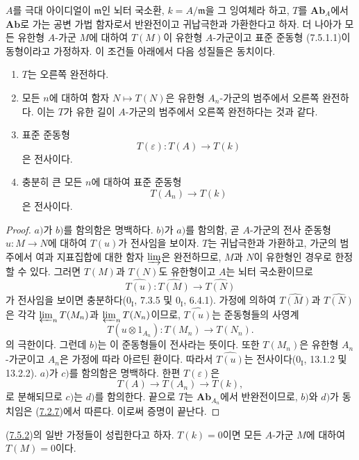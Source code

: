 \begin{proposition}[7.5.2]
\label{III.7.5.2-fr}
$A$를 극대 아이디얼이 $\mathfrak m$인 뇌터 국소환, $k=A/\mathfrak m$을
그 잉여체라 하고, $T$를 $\mathbf{Ab}_A$에서 $\mathbf{Ab}$로 가는
공변 가법 함자로서 반완전이고 귀납극한과 가환한다고 하자. 더 나아가
모든 유한형 $A$-가군 $M$에 대하여 $T(M)$이 유한형 $A$-가군이고
표준 준동형 (7.5.1.1)이 동형이라고 가정하자. 이 조건들 아래에서
다음 성질들은 동치이다.
\begin{enumerate}
  \item[a)] $T$는 오른쪽 완전하다.
  \item[b)] 모든 $n$에 대하여 함자 $N\mapsto T(N)$은 유한형
    $A_n$-가군의 범주에서 오른쪽 완전하다. 이는 $T$가 유한 길이
    $A$-가군의 범주에서 오른쪽 완전하다는 것과 같다.
  \item[c)] 표준 준동형
    \[
      T(\varepsilon):T(A)\longrightarrow T(k)
    \]
    은 전사이다.
  \item[d)] 충분히 큰 모든 $n$에 대하여 표준 준동형
    \[
      T(A_n)\longrightarrow T(k)
    \]
    은 전사이다.
\end{enumerate}
\end{proposition}

\begin{proof}
$a)$가 $b)$를 함의함은 명백하다. $b)$가 $a)$를 함의함, 곧
$A$-가군의 전사 준동형 $u:M\to N$에 대하여 $T(u)$가 전사임을
보이자. $T$는 귀납극한과 가환하고, 가군의 범주에서 여과 지표집합에
대한 함자 $\varinjlim$은 완전하므로, $M$과 $N$이 유한형인 경우로
한정할 수 있다. 그러면 $T(M)$과 $T(N)$도 유한형이고 $A$는 뇌터
국소환이므로
\[
  \widehat{T(u)}:
  \widehat{T(M)}
  \longrightarrow
  \widehat{T(N)}
\]
가 전사임을 보이면 충분하다($0_{\mathrm I}$, 7.3.5 및
$0_{\mathrm I}$, 6.4.1). 가정에 의하여 $\widehat{T(M)}$과
$\widehat{T(N)}$은 각각 $\varprojlim_n T(M_n)$과
$\varprojlim_n T(N_n)$이므로, $\widehat{T(u)}$는 준동형들의 사영계
\[
  T(u\otimes1_{A_n}):T(M_n)\longrightarrow T(N_n).
\]
의 극한이다. 그런데 $b)$는 이 준동형들이 전사라는 뜻이다. 또한
$T(M_n)$은 유한형 $A_n$-가군이고 $A_n$은 가정에 따라 아르틴 환이다.
따라서 $\widehat{T(u)}$는 전사이다($0_{\mathrm I}$, 13.1.2 및
13.2.2). $a)$가 $c)$를 함의함은 명백하다. 한편 $T(\varepsilon)$은
\[
  T(A)\longrightarrow T(A_n)\longrightarrow T(k),
\]
로 분해되므로 $c)$는 $d)$를 함의한다. 끝으로 $T$는
$\mathbf{Ab}_{A_n}$에서 반완전이므로, $b)$와 $d)$가 동치임은
(\hyperref[III.7.2.7-fr]{7.2.7})에서 따른다. 이로써 증명이 끝난다.
\end{proof}

\begin{corollary}[7.5.3]
\label{III.7.5.3-fr}
(\hyperref[III.7.5.2-fr]{7.5.2})의 일반 가정들이 성립한다고 하자.
$T(k)=0$이면 모든 $A$-가군 $M$에 대하여 $T(M)=0$이다.
\end{corollary}

